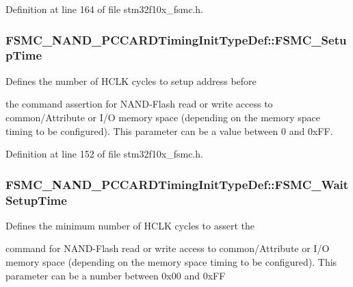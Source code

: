 Definition at line 164 of file stm32f10x\-\_\-fsmc.\-h.

\hypertarget{struct_f_s_m_c___n_a_n_d___p_c_c_a_r_d_timing_init_type_def_a31632aeb49269a29a39e3b191590b6dc}{
\subsubsection[{F\-S\-M\-C\-\_\-\-Setup\-Time}]{ F\-S\-M\-C\-\_\-\-N\-A\-N\-D\-\_\-\-P\-C\-C\-A\-R\-D\-Timing\-Init\-Type\-Def\-::\-F\-S\-M\-C\-\_\-\-Setup\-Time}}\label{struct_f_s_m_c___n_a_n_d___p_c_c_a_r_d_timing_init_type_def_a31632aeb49269a29a39e3b191590b6dc}
\begin{DoxyVerb}      Defines the number of HCLK cycles to setup address before
\end{DoxyVerb}
 the command assertion for N\-A\-N\-D-\/\-Flash read or write access to common/\-Attribute or I/\-O memory space (depending on the memory space timing to be configured). This parameter can be a value between 0 and 0x\-F\-F. 

Definition at line 152 of file stm32f10x\-\_\-fsmc.\-h.

\hypertarget{struct_f_s_m_c___n_a_n_d___p_c_c_a_r_d_timing_init_type_def_a99a7d54ed2674faa5a4e0f2669812855}{
\subsubsection[{F\-S\-M\-C\-\_\-\-Wait\-Setup\-Time}]{ F\-S\-M\-C\-\_\-\-N\-A\-N\-D\-\_\-\-P\-C\-C\-A\-R\-D\-Timing\-Init\-Type\-Def\-::\-F\-S\-M\-C\-\_\-\-Wait\-Setup\-Time}}\label{struct_f_s_m_c___n_a_n_d___p_c_c_a_r_d_timing_init_type_def_a99a7d54ed2674faa5a4e0f2669812855}
\begin{DoxyVerb}  Defines the minimum number of HCLK cycles to assert the
\end{DoxyVerb}
 command for N\-A\-N\-D-\/\-Flash read or write access to common/\-Attribute or I/\-O memory space (depending on the memory space timing to be configured). This parameter can be a number between 0x00 and 0x\-F\-F 

